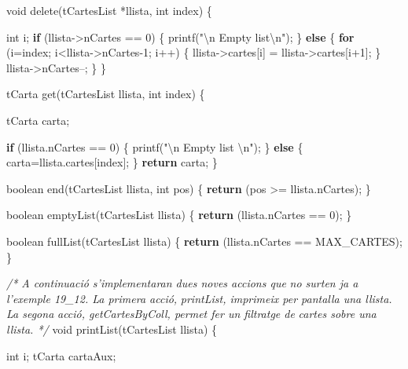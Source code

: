 \documentclass[]{book}
\newenvironment{Shaded}{\begin{snugshade}}{\end{snugshade}}
\newcommand{\DataTypeTok}[1]{\textcolor[rgb]{0.13,0.29,0.53}{#1}}
\newcommand{\DecValTok}[1]{\textcolor[rgb]{0.00,0.00,0.81}{#1}}
\newcommand{\SpecialCharTok}[1]{\textcolor[rgb]{0.00,0.00,0.00}{#1}}
\newcommand{\StringTok}[1]{\textcolor[rgb]{0.31,0.60,0.02}{#1}}
\newcommand{\CommentTok}[1]{\textcolor[rgb]{0.56,0.35,0.01}{\textit{#1}}}
\newcommand{\ControlFlowTok}[1]{\textcolor[rgb]{0.13,0.29,0.53}{\textbf{#1}}}
\newcommand{\NormalTok}[1]{#1}
\begin{document}
\begin{Shaded}
\begin{Highlighting}[]
\DataTypeTok{void}\NormalTok{ delete(tCartesList *llista, }\DataTypeTok{int}\NormalTok{ index) \{}

    \DataTypeTok{int}\NormalTok{ i;}
    \ControlFlowTok{if}\NormalTok{ (llista->nCartes == }\DecValTok{0}\NormalTok{) \{}
\NormalTok{        printf(}\StringTok{"}\SpecialCharTok{\textbackslash{}n}\StringTok{ Empty list}\SpecialCharTok{\textbackslash{}n}\StringTok{"}\NormalTok{);}
\NormalTok{    \} }\ControlFlowTok{else}\NormalTok{ \{}
        \ControlFlowTok{for}\NormalTok{ (i=index; i<llista->nCartes-}\DecValTok{1}\NormalTok{; i++) \{}
\NormalTok{            llista->cartes[i] = llista->cartes[i+}\DecValTok{1}\NormalTok{];}
\NormalTok{        \}}
\NormalTok{        llista->nCartes--;}
\NormalTok{    \}}
\NormalTok{\}}

\NormalTok{tCarta get(tCartesList llista, }\DataTypeTok{int}\NormalTok{ index) \{}

\NormalTok{    tCarta carta;}

    \ControlFlowTok{if}\NormalTok{ (llista.nCartes == }\DecValTok{0}\NormalTok{) \{}
\NormalTok{        printf(}\StringTok{"}\SpecialCharTok{\textbackslash{}n}\StringTok{ Empty list }\SpecialCharTok{\textbackslash{}n}\StringTok{"}\NormalTok{);}
\NormalTok{    \} }\ControlFlowTok{else}\NormalTok{ \{}
\NormalTok{        carta=llista.cartes[index];}
\NormalTok{    \}}
    \ControlFlowTok{return}\NormalTok{ carta;}
\NormalTok{\}}

\NormalTok{boolean end(tCartesList llista, }\DataTypeTok{int}\NormalTok{ pos) \{}
    \ControlFlowTok{return}\NormalTok{ (pos >= llista.nCartes);}
\NormalTok{\}}

\NormalTok{boolean emptyList(tCartesList llista) \{}
    \ControlFlowTok{return}\NormalTok{ (llista.nCartes == }\DecValTok{0}\NormalTok{);}
\NormalTok{\}}

\NormalTok{boolean fullList(tCartesList llista) \{}
    \ControlFlowTok{return}\NormalTok{ (llista.nCartes == MAX_CARTES);}
\NormalTok{\}}

\CommentTok{/* A continuació s'implementaran dues noves accions que}
\CommentTok{   no surten ja a l'exemple 19_12. La primera acció, }
\CommentTok{   printList, imprimeix per pantalla una llista. La segona}
\CommentTok{   acció, getCartesByColl, permet fer un filtratge de }
\CommentTok{   cartes sobre una llista. */}
\DataTypeTok{void}\NormalTok{ printList(tCartesList llista) \{}

    \DataTypeTok{int}\NormalTok{ i;}
\NormalTok{    tCarta cartaAux;}


\end{Highlighting}
\end{Shaded}
\end{document}

